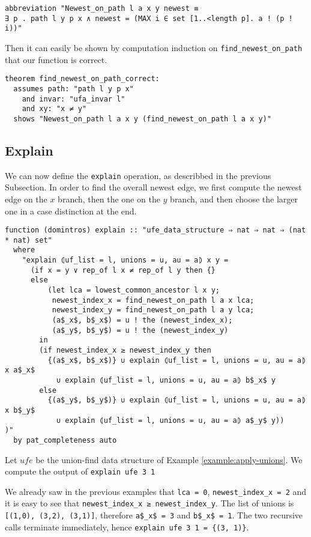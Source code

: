 \begin{lstlisting}
abbreviation "Newest_on_path l a x y newest ≡
∃ p . path l y p x ∧ newest = (MAX i ∈ set [1..<length p]. a ! (p ! i))"
\end{lstlisting}

Then it can easily be shown by computation induction on \lstinline{find_newest_on_path} that our function is correct.

\begin{lstlisting}
theorem find_newest_on_path_correct:
  assumes path: "path l y p x"
    and invar: "ufa_invar l"
    and xy: "x ≠ y"
  shows "Newest_on_path l a x y (find_newest_on_path l a x y)"
\end{lstlisting}

\subsection{Explain}

We can now define the \lstinline|explain| operation, as describbed in the previous Subsection.
In order to find the overall newest edge, we first compute the newest edge on the $x$ branch, then the one on the $y$ branch, and then choose the larger one in a case distinction at the end.

\begin{lstlisting}
function (domintros) explain :: "ufe_data_structure ⇒ nat ⇒ nat ⇒ (nat * nat) set"
  where
    "explain ⦇uf_list = l, unions = u, au = a⦈ x y =
      (if x = y ∨ rep_of l x ≠ rep_of l y then {}
      else
          (let lca = lowest_common_ancestor l x y;
           newest_index_x = find_newest_on_path l a x lca;
           newest_index_y = find_newest_on_path l a y lca;
           (a$_x$, b$_x$) = u ! the (newest_index_x);
           (a$_y$, b$_y$) = u ! the (newest_index_y)
        in
        (if newest_index_x ≥ newest_index_y then
          {(a$_x$, b$_x$)} ∪ explain ⦇uf_list = l, unions = u, au = a⦈ x a$_x$
            ∪ explain ⦇uf_list = l, unions = u, au = a⦈ b$_x$ y
        else
          {(a$_y$, b$_y$)} ∪ explain ⦇uf_list = l, unions = u, au = a⦈ x b$_y$
            ∪ explain ⦇uf_list = l, unions = u, au = a⦈ a$_y$ y))
)"
  by pat_completeness auto
\end{lstlisting}

\begin{exmp}
Let $ufe$ be the union-find data structure of Example \ref{example:apply-unions}. We compute the output of \lstinline|explain ufe 3 1|

We already saw in the previous examples that \lstinline|lca = 0|, \lstinline|newest_index_x = 2|
and it is easy to see that \lstinline|newest_index_x ≥ newest_index_y|. The list of unions is \lstinline|[(1,0), (3,2), (3,1)]|, therefore \lstinline|a$_x$ = 3| and \lstinline|b$_x$ = 1|. The two recursive calls terminate immediately, hence \lstinline|explain ufe 3 1 = {(3, 1)}|.
\end{exmp}

